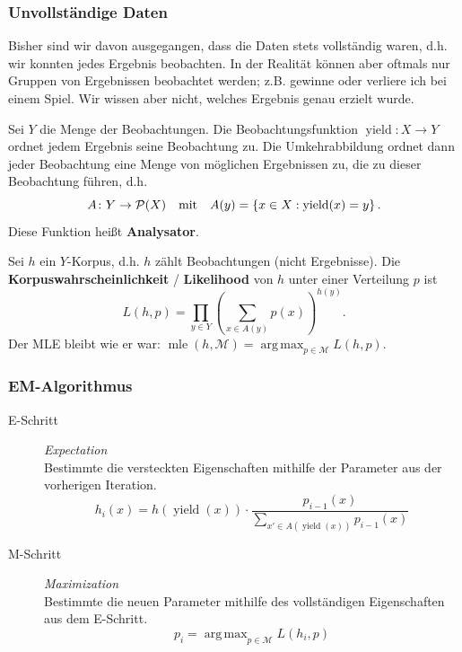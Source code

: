 \documentclass{beamer}
\DeclareMathOperator*{\argmax}{arg\,max}
\begin{document}
\begin{frame} \frametitle{Unvollständige Daten}
	\justifying \footnotesize
	Bisher sind wir davon ausgegangen, dass die Daten stets vollständig waren, d.h. wir konnten jedes Ergebnis beobachten. In der Realität können aber oftmals nur Gruppen von Ergebnissen beobachtet werden; z.B. gewinne oder verliere ich bei einem Spiel. Wir wissen aber nicht, welches Ergebnis genau erzielt wurde. 
	
	Sei $Y$ die Menge der Beobachtungen. Die Beobachtungsfunktion $\operatorname{yield} \colon X \to Y$ ordnet jedem Ergebnis seine Beobachtung zu. Die Umkehrabbildung ordnet dann jeder Beobachtung eine Menge von möglichen Ergebnissen zu, die zu dieser Beobachtung führen, d.h.
	\begin{equation*}
		A \colon Y \to \mathcal{P}(X) \quad \text{mit} \quad A(y) = \left\{ x \in X: \operatorname{yield}(x) = y \right\} .
	\end{equation*}
	Diese Funktion heißt \textbf{Analysator}. 
	
	Sei $h$ ein $Y$-Korpus, d.h. $h$ zählt Beobachtungen (nicht Ergebnisse). Die \textbf{Korpuswahrscheinlichkeit} / \textbf{Likelihood} von $h$ unter einer Verteilung $p$ ist 
	\begin{equation*}
		L(h,p) = \prod_{y \in Y} \left( \sum_{x \in A(y)} p(x) \right)^{h(y)}.
	\end{equation*}
	Der MLE bleibt wie er war: $\operatorname{mle}(h,\mathcal{M}) = \argmax_{p \in \mathcal{M}} L(h,p)$.
\end{frame}

\begin{frame} \frametitle{EM-Algorithmus}
	\begin{description}
		\item[E-Schritt] \textit{Expectation} \\
		Bestimmte die versteckten Eigenschaften mithilfe der Parameter aus der vorherigen Iteration.
		\begin{equation*}
			h_i(x) = h(\operatorname{yield}(x)) \cdot \frac{p_{i-1}(x)}{\sum_{x' \in A(\operatorname{yield}(x))} p_{i-1}(x)}
		\end{equation*}
		\item[M-Schritt] \textit{Maximization} \\
		Bestimmte die neuen Parameter mithilfe des vollständigen Eigenschaften aus dem E-Schritt.
		\begin{equation*}
			p_i = \argmax_{p \in \mathcal{M}} L(h_i, p)
		\end{equation*}
	\end{description}
\end{frame}
\end{document}
